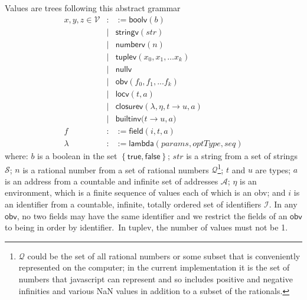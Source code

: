 \documentclass[12pt]{article}
\begin{document}
Values are trees following this abstract grammar%
\begin{eqnarray*}
x,y,z\in \mathcal{V} &:&:=\mathsf{boolv}\left( b\right) \\
&\mid &\mathsf{stringv}\left( \mathit{str}\right) \\
&\mid &\mathsf{numberv}\left( n\right) \\
&\mid &\mathsf{tuplev}\left( x_{0},x_{1},\ldots x_{k}\right) \\
&\mid &\mathsf{nullv} \\
&\mid &\mathsf{obv}\left( f_{0},f_{1},...f_{k}\right) \\
&\mid &\mathsf{locv}\left( t,a\right) \\
&\mid &\mathsf{closurev}\left( \lambda ,\eta ,t\rightarrow u,a\right) \\
&\mid &\mathsf{builtinv(}t\rightarrow u,a) \\
f &:&:=\mathsf{field}(i,t,a) \\
\lambda &:&:=\mathsf{lambda}(\mathit{params},\mathit{optType,seq})
\end{eqnarray*}%
where: $b$ is a boolean in the set $\left\{ \mathsf{true,false}\right\} $; $%
\mathit{str}$ is a string from a set of strings $\mathcal{S}$; $n$ is a
rational number from a set of rational numbers $\mathcal{Q}$\footnote{$%
\mathcal{Q}$ could be the set of all rational numbers or some subset that is
conveniently represented on the computer; in the current implementation it
is the set of numbers that javascript can represent and so includes positive
and negative infinities and various NaN values in addition to a subset of
the rationals.}; $t$ and $u$ are types; $a$ is an address from a countable
and infinite set of addresses $\mathcal{A}$; $\eta $ is an environment,
which is a finite sequence of values each of which is an \textsf{obv}; and $%
i $ is an identifier from a countable, infinite, totally ordered set of
identifiers $\mathcal{I}$. In any $\mathsf{obv}$, no two fields may have the
same identifier and we restrict the fields of an $\mathsf{obv}$ to being in
order by identifier.\ In \textsf{tuplev}, the number of values must not be 1.
\end{document}

